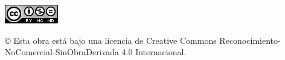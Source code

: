 \documentclass[spanish,a4paper,12pt,oneside]{extreport}
\begin{document}
\begin{center}
\includegraphics[scale=1.8]{images/by-nc-nd_88x31}\\[5mm]
\end{center}

\begin{large}
© Esta obra está bajo una licencia de Creative Commons Reconocimiento-NoComercial-SinObraDerivada 4.0 Internacional.
\end{large}











\end{document}
